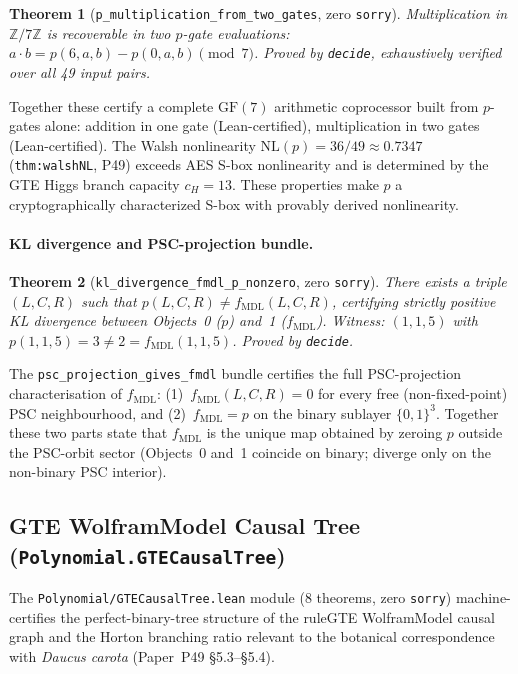 \documentclass[11pt,a4paper]{article}
\newtheorem{theorem}{Theorem}[section]
\theoremstyle{definition}
\begin{document}
\begin{theorem}[\lstinline|p_multiplication_from_two_gates|, zero \texttt{sorry}]
Multiplication in $\mathbb{Z}/7\mathbb{Z}$ is recoverable in two $p$-gate evaluations:
$a\cdot b = p(6,a,b) - p(0,a,b) \pmod{7}$.
Proved by \lstinline|decide|, exhaustively verified over all 49 input pairs.
\end{theorem}

\noindent Together these certify a complete $\mathrm{GF}(7)$ arithmetic coprocessor built from $p$-gates alone:
addition in one gate (Lean-certified), multiplication in two gates (Lean-certified).
The Walsh nonlinearity $\mathrm{NL}(p)=36/49\approx0.7347$ (\lstinline|thm:walshNL|, P49)
exceeds AES S-box nonlinearity and is determined by the GTE Higgs branch capacity $c_H=13$.
These properties make $p$ a cryptographically characterized S-box with provably derived nonlinearity.

\paragraph{KL divergence and PSC-projection bundle.}
\begin{theorem}[\lstinline|kl_divergence_fmdl_p_nonzero|, zero \texttt{sorry}]
There exists a triple $(L,C,R)$ such that $p(L,C,R)\neq f_{\mathrm{MDL}}(L,C,R)$, certifying
strictly positive KL divergence between Objects~0 ($p$) and~1 ($f_{\mathrm{MDL}}$).
Witness: $(1,1,5)$ with $p(1,1,5)=3\neq 2=f_{\mathrm{MDL}}(1,1,5)$. Proved by \lstinline|decide|.
\end{theorem}

\noindent The \lstinline|psc_projection_gives_fmdl| bundle certifies the full PSC-projection
characterisation of $f_{\mathrm{MDL}}$: (1)~$f_{\mathrm{MDL}}(L,C,R)=0$ for every free
(non-fixed-point) PSC neighbourhood, and (2)~$f_{\mathrm{MDL}}=p$ on the binary sublayer
$\{0,1\}^3$.  Together these two parts state that $f_{\mathrm{MDL}}$ is the unique map
obtained by zeroing $p$ outside the PSC-orbit sector (Objects~0 and~1 coincide on binary;
diverge only on the non-binary PSC interior).

\subsection{GTE WolframModel Causal Tree (\texttt{Polynomial.GTECausalTree})}\label{subsec:gte-causal-tree}

The \texttt{Polynomial/GTECausalTree.lean} module (8 theorems, zero \lstinline|sorry|)
machine-certifies the perfect-binary-tree structure of the ruleGTE WolframModel causal
graph and the Horton branching ratio relevant to the botanical correspondence with
\emph{Daucus carota} (Paper~P49 \S5.3--\S5.4).
\end{document}
